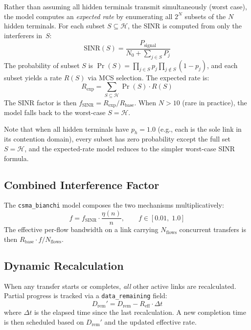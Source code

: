 \documentclass[11pt,a4paper]{article}
\begin{document}
Rather than assuming all hidden terminals transmit simultaneously (worst case), the model computes an \emph{expected rate} by enumerating all $2^N$ subsets of the $N$ hidden terminals. For each subset $S \subseteq \mathcal{H}$, the SINR is computed from only the interferers in~$S$:
\begin{equation}
    \text{SINR}(S) = \frac{P_{\text{signal}}}{N_0 + \sum_{j \in S} P_j}
\end{equation}
The probability of subset $S$ is $\Pr(S) = \prod_{j \in S} p_j \prod_{j \notin S}(1-p_j)$, and each subset yields a rate $R(S)$ via MCS selection. The expected rate is:
\begin{equation}
    R_{\text{exp}} = \sum_{S \subseteq \mathcal{H}} \Pr(S) \cdot R(S)
    \label{eq:expected_rate}
\end{equation}
The SINR factor is then $f_{\text{SINR}} = R_{\text{exp}} / R_{\text{base}}$. When $N > 10$ (rare in practice), the model falls back to the worst-case $S = \mathcal{H}$.

Note that when all hidden terminals have $p_h = 1.0$ (e.g., each is the sole link in its contention domain), every subset has zero probability except the full set $S = \mathcal{H}$, and the expected-rate model reduces to the simpler worst-case SINR formula.

\subsection{Combined Interference Factor}

The \texttt{csma\_bianchi} model composes the two mechanisms multiplicatively:
\begin{equation}
    f = f_{\text{SINR}} \cdot \frac{\eta(n)}{n}, \qquad f \in [0.01, \; 1.0]
\end{equation}
The effective per-flow bandwidth on a link carrying $N_{\text{flows}}$ concurrent transfers is then $R_{\text{base}} \cdot f / N_{\text{flows}}$.

\subsection{Dynamic Recalculation}

When any transfer starts or completes, \emph{all} other active links are recalculated. Partial progress is tracked via a \texttt{data\_remaining} field:
\begin{equation}
    D_{\text{rem}}' = D_{\text{rem}} - R_{\text{eff}} \cdot \Delta t
\end{equation}
where $\Delta t$ is the elapsed time since the last recalculation. A new completion time is then scheduled based on $D_{\text{rem}}'$ and the updated effective rate.
\end{document}
